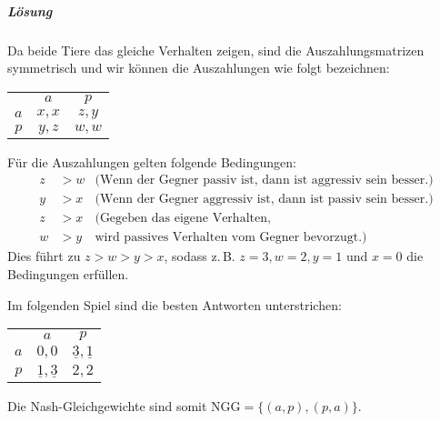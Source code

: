 \subparagraph{Lösung}%

Da beide Tiere das gleiche Verhalten zeigen, sind die Auszahlungsmatrizen symmetrisch und
wir können die Auszahlungen wie folgt bezeichnen:
\begin{center}
  \begin{tabular}{ccc}
    & $a$ & $p$\\
    \cmidrule{2-3}
    $a$ & $x,x$ & $z,y$\\
    \cmidrule{2-3}
    $p$ & $y,z$ & $w,w$\\
    \cmidrule{2-3}
  \end{tabular}
\end{center}
Für die Auszahlungen gelten folgende Bedingungen:
\begin{align*}
  z & > w & \text{(Wenn der Gegner passiv ist, dann ist aggressiv sein besser.)}\\
  y & > x & \text{(Wenn der Gegner aggressiv ist, dann ist passiv sein besser.)}\\
  z & > x & \text{(Gegeben das eigene Verhalten,}\\
  w & > y & \text{wird passives Verhalten vom Gegner bevorzugt.)}
\end{align*}
Dies führt zu $z > w > y > x$, sodass z.\,B. $z = 3, w = 2, y = 1$ und $x=0$ die
Bedingungen erfüllen.

Im folgenden Spiel sind die besten Antworten unterstrichen:
\begin{center}
  \begin{tabular}{ccc}
    & $a$ & $p$\\
    \cmidrule{2-3}
    $a$ & $0,0$ & $\underline{3},\underline{1}$\\
    \cmidrule{2-3}
    $p$ & $\underline{1},\underline{3}$ & $2,2$\\
    \cmidrule{2-3}
  \end{tabular}
\end{center}
Die Nash-Gleichgewichte sind somit $\text{NGG} = \{(a,p), (p,a)\}$.
